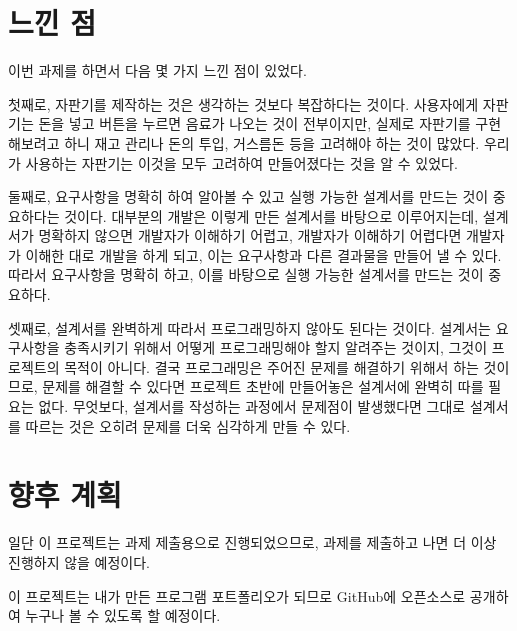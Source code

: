 \documentclass{oblivoir}
\begin{document}
    \section{느낀 점}

    이번 과제를 하면서 다음 몇 가지 느낀 점이 있었다.

    첫째로, 자판기를 제작하는 것은 생각하는 것보다 복잡하다는 것이다.
    사용자에게 자판기는 돈을 넣고 버튼을 누르면 음료가 나오는 것이 전부이지만,
    실제로 자판기를 구현해보려고 하니 재고 관리나 돈의 투입, 거스름돈 등을 고려해야 하는 것이 많았다.
    우리가 사용하는 자판기는 이것을 모두 고려하여 만들어졌다는 것을 알 수 있었다.

    둘째로, 요구사항을 명확히 하여 알아볼 수 있고 실행 가능한 설계서를 만드는 것이 중요하다는 것이다.
    대부분의 개발은 이렇게 만든 설계서를 바탕으로 이루어지는데,
    설계서가 명확하지 않으면 개발자가 이해하기 어렵고, 개발자가 이해하기 어렵다면
    개발자가 이해한 대로 개발을 하게 되고, 이는 요구사항과 다른 결과물을 만들어 낼 수 있다.
    따라서 요구사항을 명확히 하고, 이를 바탕으로 실행 가능한 설계서를 만드는 것이 중요하다.

    셋째로, 설계서를 완벽하게 따라서 프로그래밍하지 않아도 된다는 것이다.
    설계서는 요구사항을 충족시키기 위해서 어떻게 프로그래밍해야 할지 알려주는 것이지,
    그것이 프로젝트의 목적이 아니다.
    결국 프로그래밍은 주어진 문제를 해결하기 위해서 하는 것이므로,
    문제를 해결할 수 있다면 프로젝트 초반에 만들어놓은 설계서에 완벽히 따를 필요는 없다.
    무엇보다, 설계서를 작성하는 과정에서 문제점이 발생했다면
    그대로 설계서를 따르는 것은 오히려 문제를 더욱 심각하게 만들 수 있다.

    \section{향후 계획}

    일단 이 프로젝트는 과제 제출용으로 진행되었으므로, 과제를 제출하고 나면
    더 이상 진행하지 않을 예정이다.

    이 프로젝트는 내가 만든 프로그램 포트폴리오가 되므로
    GitHub에 오픈소스로 공개하여 누구나 볼 수 있도록 할 예정이다.
\end{document}

